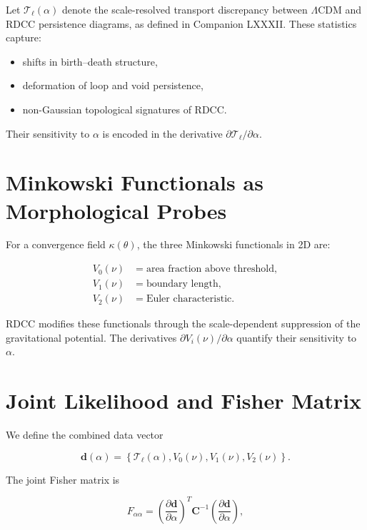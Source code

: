 \documentclass[11pt,a4paper]{article}
\begin{document}
Let $\mathcal{T}_{\ell}(\alpha)$ denote the scale-resolved transport discrepancy 
between $\Lambda$CDM and RDCC persistence diagrams, as defined in Companion 
LXXXII. These statistics capture:

\begin{itemize}
    \item shifts in birth–death structure,
    \item deformation of loop and void persistence,
    \item non-Gaussian topological signatures of RDCC.
\end{itemize}

Their sensitivity to $\alpha$ is encoded in the derivative 
$\partial \mathcal{T}_{\ell} / \partial \alpha$.
\section{Minkowski Functionals as Morphological Probes}

For a convergence field $\kappa(\theta)$, the three Minkowski functionals in 2D 
are:

\begin{align}
    V_{0}(\nu) &= \text{area fraction above threshold}, \\
    V_{1}(\nu) &= \text{boundary length}, \\
    V_{2}(\nu) &= \text{Euler characteristic}.
\end{align}

RDCC modifies these functionals through the scale-dependent suppression of the 
gravitational potential. The derivatives 
$\partial V_{i}(\nu) / \partial \alpha$ quantify their sensitivity to $\alpha$.
\section{Joint Likelihood and Fisher Matrix}

We define the combined data vector



\[
    \mathbf{d}(\alpha)
    =
    \left\{
        \mathcal{T}_{\ell}(\alpha),
        V_{0}(\nu),
        V_{1}(\nu),
        V_{2}(\nu)
    \right\}.
\]



The joint Fisher matrix is

\begin{equation}
    F_{\alpha\alpha}
    =
    \left(
        \frac{\partial \mathbf{d}}{\partial \alpha}
    \right)^{\!\!T}
    \mathbf{C}^{-1}
    \left(
        \frac{\partial \mathbf{d}}{\partial \alpha}
    \right),
\end{equation}
\end{document}
